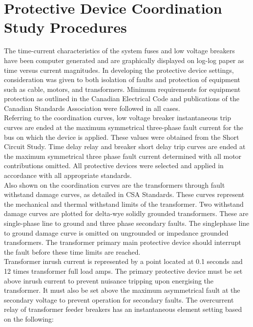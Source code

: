 \section{Protective Device Coordination Study Procedures}
\label{af:pdcp}

\noindent The time-current characteristics of the system fuses and low voltage breakers have been computer generated and are graphically displayed on log-log paper as time
versus current magnitudes. In developing the protective device settings, consideration was given to both isolation of faults and protection of equipment such as cable, motors, and transformers. Minimum requirements for equipment protection as outlined in the Canadian Electrical Code and publications of the Canadian Standards Association were followed in all cases.\\

\noindent Referring to the coordination curves, low voltage breaker instantaneous trip curves are ended at the maximum symmetrical three-phase fault current for the bus on which the device is applied. These values were obtained from the Short Circuit Study. Time delay relay and breaker short delay trip curves are ended at the maximum symmetrical three phase fault current determined with all motor contributions omitted. All protective devices were selected and applied in accordance with all appropriate standards.\\

\noindent Also shown on the coordination curves are the transformers through fault withstand damage curves, as detailed in CSA Standards. These curves represent the mechanical and thermal withstand limits of the transformer. Two withstand damage curves are plotted for delta-wye solidly grounded transformers. These are single-phase line to ground and three phase secondary faults. The singlephase line to ground damage curve is omitted on ungrounded or impedance grounded transformers. The transformer primary main protective device should interrupt the fault before these time limits are reached.\\

\noindent Transformer inrush current is represented by a point located at 0.1 seconds and 12 times transformer full load amps. The primary protective device must be set above
inrush current to prevent nuisance tripping upon energising the transformer. It must also be set above the maximum asymmetrical fault at the secondary voltage to prevent operation for secondary faults. The overcurrent relay of transformer feeder breakers has an instantaneous element setting based on the following:\\

